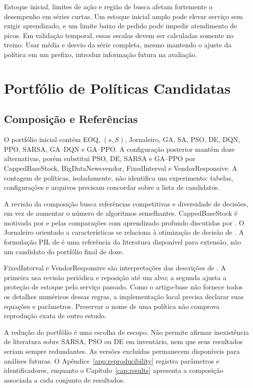 Estoque inicial, limites de ação e região de busca afetam fortemente o desempenho em séries curtas. Um estoque inicial amplo pode elevar serviço sem exigir aprendizado, e um limite baixo de pedido pode impedir atendimento de picos. Em validação temporal, essas escalas devem ser calculadas somente no treino. Usar média e desvio da série completa, mesmo mantendo o ajuste da política em um prefixo, introduz informação futura na avaliação.

\section{Portfólio de Políticas Candidatas}
\label{sec:benchmark_massivo}
\subsection{Composição e Referências}
\label{sec:portfolio_ampliado}

O portfólio inicial contém EOQ, $(s,S)$, Jornaleiro, GA, SA, PSO, DE, DQN, PPO, SARSA, GA--DQN e GA--PPO. A configuração posterior mantém doze alternativas, porém substitui PSO, DE, SARSA e GA--PPO por CappedBaseStock, BigDataNewsvendor, FixedInterval e VendorResponsive. A contagem de políticas, isoladamente, não identifica um experimento: tabelas, configurações e arquivos precisam concordar sobre a lista de candidatos.

A revisão da composição busca referências competitivas e diversidade de decisões, em vez de aumentar o número de algoritmos semelhantes. CappedBaseStock é motivada por \citet{Xin2021CappedBaseStock} e pelas comparações com aprendizado profundo discutidas por \citet{Temizoz2025DeepControlledLearning}. O Jornaleiro orientado a características se relaciona à otimização de decisão de \citet{BanRudin2019BigDataNewsvendor}. A formulação PIL de \citet{VanJaarsveldArts2024PIL} é uma referência da literatura disponível para extensão, não um candidato do portfólio final de doze.

FixedInterval e VendorResponsive são interpretações das descrições de \citet{Zabraoui2025GaDQN}. A primeira usa revisão periódica e reposição até um alvo; a segunda ajusta a proteção de estoque pelo serviço passado. Como o artigo-base não fornece todos os detalhes numéricos dessas regras, a implementação local precisa declarar suas equações e parâmetros. Preservar o nome de uma política não comprova reprodução exata de outro estudo.

A redução do portfólio é uma escolha de escopo. Não permite afirmar inexistência de literatura sobre SARSA, PSO ou DE em inventário, nem que seus resultados seriam sempre redundantes. As versões excluídas permanecem disponíveis para análises futuras. O Apêndice~\ref{app:reproducibility} registra parâmetros e identificadores, enquanto o Capítulo~\ref{cap:results} apresenta a composição associada a cada conjunto de resultados.

